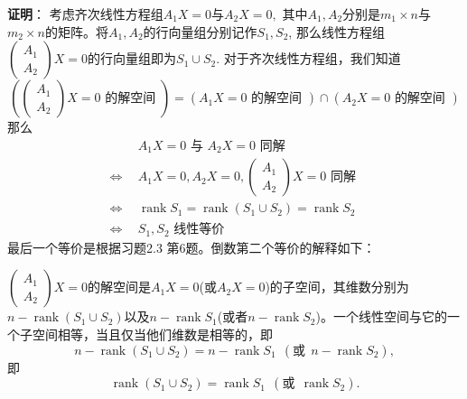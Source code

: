 \ifIncludeAnswer

\newpageorvspace

{\bf 证明}： 考虑齐次线性方程组$A_1X = 0$与$A_2X = 0,$ 其中$A_1, A_2$分别是$m_1\times n$与$m_2\times n$的矩阵。将$A_1, A_2$的行向量组分别记作$S_1, S_2$, 那么线性方程组$\begin{pmatrix}A_1 \\ A_2\end{pmatrix} X = 0$的行向量组即为$S_1 \cup S_2$. 对于齐次线性方程组，我们知道
$$\left( \begin{pmatrix}A_1 \\ A_2\end{pmatrix} X = 0 \text{ 的解空间 } \right) = \left( A_1 X = 0 \text{ 的解空间 } \right) \cap \left( A_2X = 0 \text{ 的解空间 } \right)$$
那么
\begin{align*}
& ~~ A_1X = 0 \text{ 与 } A_2X = 0 \text{ 同解 } \\
\Longleftrightarrow & ~~ A_1X = 0, A_2X = 0, \begin{pmatrix}A_1 \\ A_2\end{pmatrix} X = 0 \text{ 同解 } \\
\Longleftrightarrow & ~~ \operatorname{rank} S_1 = \operatorname{rank} (S_1 \cup S_2) = \operatorname{rank} S_2 \\
\Longleftrightarrow & ~~ S_1, S_2 \text{ 线性等价 }
\end{align*}
最后一个等价是根据习题2.3 第6题。倒数第二个等价的解释如下：

$\begin{pmatrix}A_1 \\ A_2\end{pmatrix} X = 0$的解空间是$A_1X = 0$(或$A_2X = 0$)的子空间，其维数分别为$n - \operatorname{rank} (S_1\cup S_2)$以及$n - \operatorname{rank} S_1$(或者$n - \operatorname{rank} S_2$)。一个线性空间与它的一个子空间相等，当且仅当他们维数是相等的，即
$$n - \operatorname{rank} (S_1\cup S_2) = n - \operatorname{rank} S_1 ~~ (\text{或} ~~ n - \operatorname{rank} S_2),$$
即
$$\operatorname{rank} (S_1\cup S_2) = \operatorname{rank} S_1 ~~ (\text{或} ~~ \operatorname{rank} S_2).$$

\fi  %


